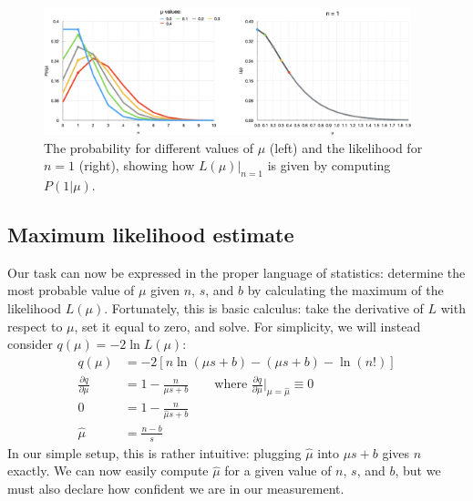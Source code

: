 \begin{figure}[htb]
    \centering
    \includegraphics[width=0.95\textwidth]{fig/stats/prob_vs_like.png}
    \caption[The probability and likelihood.]{
        The probability for different values of $\mu$ (left) and the likelihood for $n = 1$ (right), showing how $L(\mu)|_{n=1}$ is given by computing $P(1|\mu)$. 
    }
    \label{fig:prob_vs_like}
\end{figure}

\subsection{Maximum likelihood estimate}
Our task can now be expressed in the proper language of statistics: determine the most probable value of $\mu$ given $n$, $s$, and $b$ by calculating the maximum of the likelihood $L(\mu)$. 
Fortunately, this is basic calculus: take the derivative of $L$ with respect to $\mu$, set it equal to zero, and solve. 
For simplicity, we will instead consider $q(\mu) = -2\ln{L(\mu)}$:
\begin{align}
    q(\mu) &= -2[n\ln(\mu s + b) - (\mu s + b) - \ln{(n!)}] \nonumber \\
    \frac{\partial q}{\partial \mu} &= 1 - \frac{n}{\mu s + b}\qquad\text{where }\frac{\partial q}{\partial \mu}\bigg|_{\mu=\hat{\mu}} \equiv 0 \nonumber \\
    0 &= 1 - \frac{n}{\hat{\mu} s + b} \nonumber \\
    \hat{\mu} &= \frac{n - b}{s}
\end{align}
In our simple setup, this is rather intuitive: plugging $\hat{\mu}$ into $\mu s + b$ gives $n$ exactly. 
We can now easily compute $\hat{\mu}$ for a given value of $n$, $s$, and $b$, but we must also declare how confident we are in our measurement.

